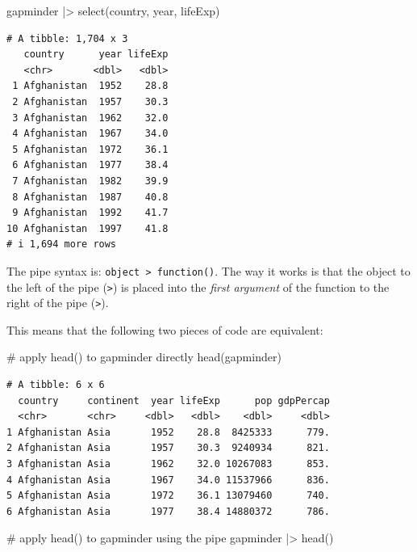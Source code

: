 \documentclass[
  letterpaper,
  DIV=11,
  numbers=noendperiod]{scrreprt}
\newenvironment{Shaded}{\begin{snugshade}}{\end{snugshade}}
\newcommand{\CommentTok}[1]{\textcolor[rgb]{0.37,0.37,0.37}{#1}}
\newcommand{\FunctionTok}[1]{\textcolor[rgb]{0.28,0.35,0.67}{#1}}
\newcommand{\NormalTok}[1]{\textcolor[rgb]{0.00,0.23,0.31}{#1}}
\newcommand{\SpecialCharTok}[1]{\textcolor[rgb]{0.37,0.37,0.37}{#1}}
\begin{document}
\begin{Shaded}
\begin{Highlighting}[]
\NormalTok{gapminder }\SpecialCharTok{|\textgreater{}} \FunctionTok{select}\NormalTok{(country, year, lifeExp)}
\end{Highlighting}
\end{Shaded}

\begin{verbatim}
# A tibble: 1,704 x 3
   country      year lifeExp
   <chr>       <dbl>   <dbl>
 1 Afghanistan  1952    28.8
 2 Afghanistan  1957    30.3
 3 Afghanistan  1962    32.0
 4 Afghanistan  1967    34.0
 5 Afghanistan  1972    36.1
 6 Afghanistan  1977    38.4
 7 Afghanistan  1982    39.9
 8 Afghanistan  1987    40.8
 9 Afghanistan  1992    41.7
10 Afghanistan  1997    41.8
# i 1,694 more rows
\end{verbatim}

The pipe syntax is:
\texttt{object\ \textbar{}\textgreater{}\ function()}. The way it works
is that the object to the left of the pipe
(\texttt{\textbar{}\textgreater{}}) is placed into the \emph{first
argument} of the function to the right of the pipe
(\texttt{\textbar{}\textgreater{}}).

This means that the following two pieces of code are equivalent:

\begin{Shaded}
\begin{Highlighting}[]
\CommentTok{\# apply head() to gapminder directly}
\FunctionTok{head}\NormalTok{(gapminder)}
\end{Highlighting}
\end{Shaded}

\begin{verbatim}
# A tibble: 6 x 6
  country     continent  year lifeExp      pop gdpPercap
  <chr>       <chr>     <dbl>   <dbl>    <dbl>     <dbl>
1 Afghanistan Asia       1952    28.8  8425333      779.
2 Afghanistan Asia       1957    30.3  9240934      821.
3 Afghanistan Asia       1962    32.0 10267083      853.
4 Afghanistan Asia       1967    34.0 11537966      836.
5 Afghanistan Asia       1972    36.1 13079460      740.
6 Afghanistan Asia       1977    38.4 14880372      786.
\end{verbatim}

\begin{Shaded}
\begin{Highlighting}[]
\CommentTok{\# apply head() to gapminder using the pipe}
\NormalTok{gapminder }\SpecialCharTok{|\textgreater{}} \FunctionTok{head}\NormalTok{()}
\end{Highlighting}
\end{Shaded}
\end{document}
